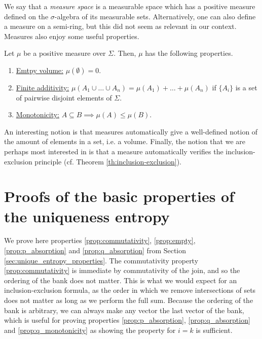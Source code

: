 We say that a \textit{measure space} is a measurable space which has a positive measure defined on the $\sigma$-algebra of its measurable sets. Alternatively, one can also define a measure on a semi-ring, but this did not seem as relevant in our context. Measures also enjoy some useful properties.

\begin{appendix_theorem} \label{th:measure_properties}
    Let $\mu$ be a positive measure over $\Sigma$. Then, $\mu$ has the following properties.
    \begin{enumerate}
        \item \underline{Emtpy volume:} $\mu(\emptyset) = 0$.
        \item \underline{Finite additivity:} $\mu(A_1 \cup \dots \cup A_n) = \mu(A_1) + \dots + \mu(A_n)$ if $\{A_i\}$ is a set of pairwise disjoint elements of $\Sigma$.
        \item \underline{Monotonicity:} $A \subseteq B \implies \mu(A) \leq \mu(B)$.
    \end{enumerate}
\end{appendix_theorem}

An interesting notion is that measures automatically give a well-defined notion of the amount of elements in a set, i.e. a volume. Finally, the notion that we are perhaps most interested in is that a measure automatically verifies the inclusion-exclusion principle (cf. Theorem \ref{th:inclusion-exclusion}).



\newpage

\section{Proofs of the basic properties of the uniqueness entropy} \label{app:unique_entropy_properties}

\setcounter{equation}{0}

We prove here properties \ref{prop:commutativity}, \ref{prop:empty}, \ref{prop:p_absorption} and \ref{prop:q_absorption} from Section \ref{sec:unique_entropy_properties}. The commutativity property \ref{prop:commutativity} is immediate by commutativity of the join, and so the ordering of the bank does not matter. This is what we would expect for an inclusion-exclusion formula, as the order in which we remove intersections of sets does not matter as long as we perform the full sum. Because the ordering of the bank is arbitrary, we can always make any vector the last vector of the bank, which is useful for proving properties \ref{prop:p_absorption}, \ref{prop:q_absorption} and \ref{prop:q_monotonicity} as showing the property for $i = k$ is sufficient.

